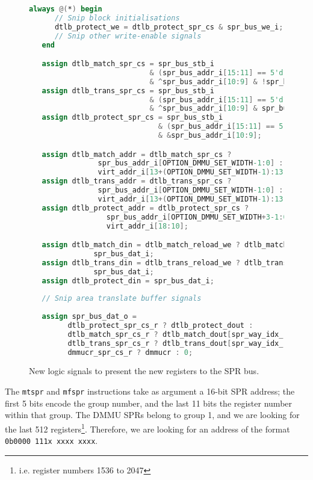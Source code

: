 \begin{figure}[t]
  \centering
  \begin{lstlisting}[language=Verilog]
   always @(*) begin
      // Snip block initialisations
      dtlb_protect_we = dtlb_protect_spr_cs & spr_bus_we_i;
      // Snip other write-enable signals
   end

   assign dtlb_match_spr_cs = spr_bus_stb_i
                            & (spr_bus_addr_i[15:11] == 5'd1)
                            & ^spr_bus_addr_i[10:9] & !spr_bus_addr_i[7];
   assign dtlb_trans_spr_cs = spr_bus_stb_i
                            & (spr_bus_addr_i[15:11] == 5'd1)
                            & ^spr_bus_addr_i[10:9] & spr_bus_addr_i[7];
   assign dtlb_protect_spr_cs = spr_bus_stb_i
                              & (spr_bus_addr_i[15:11] == 5'd1)
                              & &spr_bus_addr_i[10:9];

   assign dtlb_match_addr = dtlb_match_spr_cs ?
			    spr_bus_addr_i[OPTION_DMMU_SET_WIDTH-1:0] :
			    virt_addr_i[13+(OPTION_DMMU_SET_WIDTH-1):13];
   assign dtlb_trans_addr = dtlb_trans_spr_cs ?
			    spr_bus_addr_i[OPTION_DMMU_SET_WIDTH-1:0] :
			    virt_addr_i[13+(OPTION_DMMU_SET_WIDTH-1):13];
   assign dtlb_protect_addr = dtlb_protect_spr_cs ?
			      spr_bus_addr_i[OPTION_DMMU_SET_WIDTH+3-1:0] :
			      virt_addr_i[18:10];

   assign dtlb_match_din = dtlb_match_reload_we ? dtlb_match_reload_din :
			   spr_bus_dat_i;
   assign dtlb_trans_din = dtlb_trans_reload_we ? dtlb_trans_reload_din :
			   spr_bus_dat_i;
   assign dtlb_protect_din = spr_bus_dat_i;
   
   // Snip area translate buffer signals
   
   assign spr_bus_dat_o =
         dtlb_protect_spr_cs_r ? dtlb_protect_dout :
         dtlb_match_spr_cs_r ? dtlb_match_dout[spr_way_idx_r] :
         dtlb_trans_spr_cs_r ? dtlb_trans_dout[spr_way_idx_r] :
         dmmucr_spr_cs_r ? dmmucr : 0;
  \end{lstlisting}
  \caption{New logic signals to present the new registers to the SPR bus.}
  \label{fig:spr_logic}
\end{figure}

The \texttt{mtspr} and \texttt{mfspr} instructions take as argument a 16-bit SPR address; the first 5 bits encode the group number, and the last 11 bits the register number within that group. The DMMU SPRs belong to group 1, and we are looking for the last 512 registers\footnote{i.e. register numbers 1536 to 2047}. Therefore, we are looking for an address of the format \texttt{0b0000 111x xxxx xxxx}.

